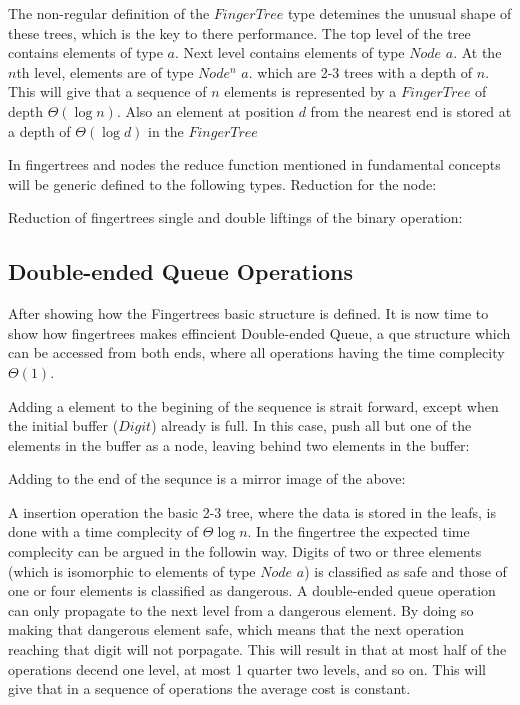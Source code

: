The non-regular definition of the $FingerTree$ type detemines the unusual shape
of these trees, which is the key to there performance. The top level of the tree
contains elements of type $a$. Next level contains elements of type $Node$ $a$.
At the $n$th level, elements are of type $Node^n$ $a$. which are 2-3 trees with
a depth of $n$. This will give that a sequence of $n$ elements is represented by
a $FingerTree$ of depth $\Theta(\log n)$. Also an element at position $d$ from
the nearest end is stored at a depth of $\Theta(\log d)$ in the $FingerTree$
\cite{fingertree}

In fingertrees and nodes the reduce function mentioned in fundamental concepts
will be generic defined to the following types. 
Reduction for the node:

Reduction of fingertrees single and double liftings of the binary operation:


\subsection{Double-ended Queue Operations}
After showing how the Fingertrees basic structure is defined. It is now time to
show how fingertrees makes effincient Double-ended Queue, a que structure which
can be accessed from both ends, where all operations having the time complecity
$\Theta(1)$.

Adding a element to the begining of the sequence is strait forward, except when
the initial buffer ($Digit$) already is full. In this case, push all but one of
the elements in the buffer as a node, leaving behind two elements in the buffer:

Adding to the end of the sequnce is a mirror image of the above:


A insertion operation the basic 2-3 tree, where the data is stored in the leafs,
is done with a time complecity of $\Theta \log n$. In the fingertree the
expected time complecity can be argued in the followin way. Digits of two or
three elements (which is isomorphic to elements of type $Node$ $a$) is
classified as safe and those of one or four elements is classified as dangerous.
A double-ended queue operation can only propagate to the next level from a
dangerous element. By doing so making that dangerous element safe, which means
that the next operation reaching that digit will not porpagate. This will result
in that at most half of the operations decend one level, at most 1 quarter two
levels, and so on. This will give that in a sequence of operations the average
cost is constant.

